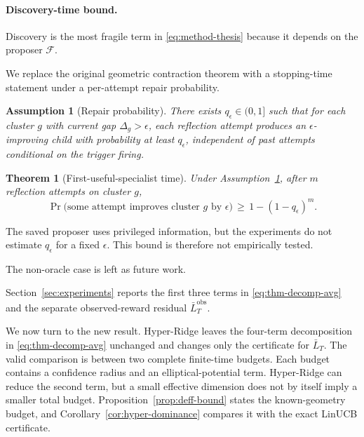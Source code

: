 \documentclass{article} %
\newtheorem{theorem}{Theorem}
\newtheorem{assumption}{Assumption}
\begin{document}
\paragraph{Discovery-time bound.}

\label{sec:method-specialist}

Discovery is the most fragile term in \eqref{eq:method-thesis} because it depends on the proposer $\mathcal{F}$.

We replace the original geometric contraction theorem with a stopping-time statement under a per-attempt repair probability.

\begin{assumption}[Repair probability]
\label{ass:repair}
There exists $q_\epsilon \in (0,1]$ such that for each cluster $g$ with current gap $\Delta_g > \epsilon$, each reflection attempt produces an $\epsilon$-improving child with probability at least $q_\epsilon$, independent of past attempts conditional on the trigger firing.
\end{assumption}

\begin{theorem}[First-useful-specialist time]
\label{thm:specialist}
Under Assumption~\ref{ass:repair}, after $m$ reflection attempts on cluster $g$,
\begin{equation}
\label{eq:thm-specialist}
\Pr\bigl(\text{some attempt improves cluster } g \text{ by } \epsilon\bigr) \,\ge\, 1 - (1 - q_\epsilon)^m.
\end{equation}
\end{theorem}

The saved proposer uses privileged information, but the experiments do not
estimate \(q_\epsilon\) for a fixed \(\epsilon\). This bound is therefore not
empirically tested.

The non-oracle case is left as future work.

Section~\ref{sec:experiments} reports the first three terms in
\eqref{eq:thm-decomp-avg} and the separate observed-reward residual
\(\bar L_T^{\mathrm{obs}}\).

We now turn to the new result. Hyper-Ridge leaves the four-term decomposition
in \eqref{eq:thm-decomp-avg} unchanged and changes only the certificate for
$\bar L_T$. The valid
comparison is between two complete finite-time budgets. Each budget contains a
confidence radius and an elliptical-potential term. Hyper-Ridge can reduce the
second term, but a small effective dimension does not by itself imply a smaller
total budget. Proposition~\ref{prop:deff-bound} states the known-geometry
budget, and Corollary~\ref{cor:hyper-dominance} compares it with the exact
LinUCB certificate.
\end{document}

